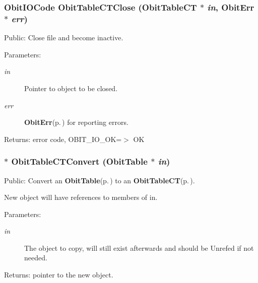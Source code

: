 \subsubsection{\setlength{\rightskip}{0pt plus 5cm}Obit\-IOCode Obit\-Table\-CTClose ({\bf Obit\-Table\-CT} $\ast$ {\em in}, {\bf Obit\-Err} $\ast$ {\em err})}\label{ObitTableCT_8c_a25}


Public: Close file and become inactive. 

\begin{Desc}
\item[Parameters:]
\begin{description}
\item[{\em in}]Pointer to object to be closed. \item[{\em err}]{\bf Obit\-Err}{\rm (p.\,\pageref{structObitErr})} for reporting errors. \end{description}
\end{Desc}
\begin{Desc}
\item[Returns:]error code, OBIT\_\-IO\_\-OK=$>$ OK \end{Desc}
\subsubsection{$\ast$ Obit\-Table\-CTConvert ({\bf Obit\-Table} $\ast$ {\em in})}\label{ObitTableCT_8c_a19}


Public: Convert an {\bf Obit\-Table}{\rm (p.\,\pageref{structObitTable})} to an {\bf Obit\-Table\-CT}{\rm (p.\,\pageref{structObitTableCT})}. 

New object will have references to members of in. \begin{Desc}
\item[Parameters:]
\begin{description}
\item[{\em in}]The object to copy, will still exist afterwards and should be Unrefed if not needed. \end{description}
\end{Desc}
\begin{Desc}
\item[Returns:]pointer to the new object. \end{Desc}
